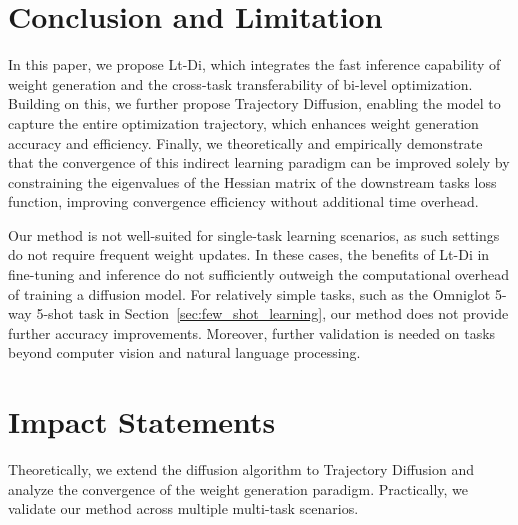 \section{Conclusion and Limitation}\label{sec:conclusion}
In this paper, we propose Lt-Di, which integrates the fast inference capability of weight generation and the cross-task transferability of bi-level optimization. Building on this, we further propose Trajectory Diffusion, enabling the model to capture the entire optimization trajectory, which enhances weight generation accuracy and efficiency. Finally, we theoretically and empirically demonstrate that the convergence of this indirect learning paradigm can be improved solely by constraining the eigenvalues of the Hessian matrix of the downstream tasks loss function, improving convergence efficiency without additional time overhead.

Our method is not well-suited for single-task learning scenarios, as such settings do not require frequent weight updates. In these cases, the benefits of Lt-Di in fine-tuning and inference do not sufficiently outweigh the computational overhead of training a diffusion model. For relatively simple tasks, such as the Omniglot 5-way 5-shot task in Section~\ref{sec:few_shot_learning}, our method does not provide further accuracy improvements. Moreover, further validation is needed on tasks beyond computer vision and natural language processing.

\section*{Impact Statements}
Theoretically, we extend the diffusion algorithm to Trajectory Diffusion and analyze the convergence of the weight generation paradigm. Practically, we validate our method across multiple multi-task scenarios.
